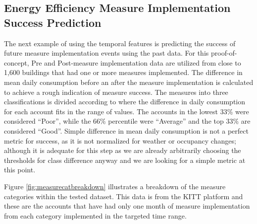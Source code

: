\subsection{Energy Efficiency Measure Implementation Success Prediction}
\label{sec:measuresuccess}

The next example of using the temporal features is predicting the success of future measure implementation events using the past data. For this proof-of-concept, Pre and Post-measure implementation data are utilized from close to 1,600 buildings that had one or more measures implemented. The difference in mean daily consumption before an after the measure implementation is calculated to achieve a rough indication of measure success. The measures into three classifications is divided according to where the difference in daily consumption for each account fits in the range of values. The accounts in the lowest 33\% were considered “Poor”, while the 66\% percentile were “Average” and the top 33\% are considered “Good”. Simple difference in mean daily consumption is not a perfect metric for success, as it is not normalized for weather or occupancy changes; although it is adequate for this step as we are already arbitrarily choosing the thresholds for class difference anyway and we are looking for a simple metric at this point. 


Figure \ref{fig:measurecatbreakdown} illustrates a breakdown of the measure categories within the tested dataset. This data is from the KITT platform and these are the accounts that have had only one month of measure implementation from each category implemented in the targeted time range.